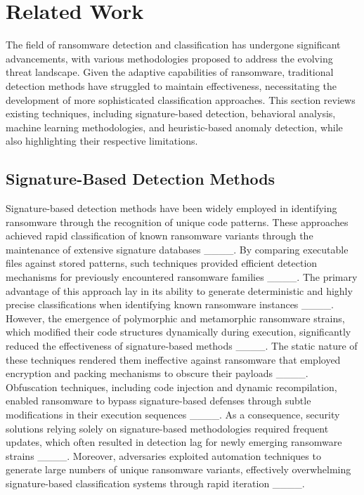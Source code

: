 \section{Related Work}
The field of ransomware detection and classification has undergone significant advancements, with various methodologies proposed to address the evolving threat landscape. Given the adaptive capabilities of ransomware, traditional detection methods have struggled to maintain effectiveness, necessitating the development of more sophisticated classification approaches. This section reviews existing techniques, including signature-based detection, behavioral analysis, machine learning methodologies, and heuristic-based anomaly detection, while also highlighting their respective limitations.

\subsection{Signature-Based Detection Methods}

Signature-based detection methods have been widely employed in identifying ransomware through the recognition of unique code patterns. These approaches achieved rapid classification of known ransomware variants through the maintenance of extensive signature databases ____. By comparing executable files against stored patterns, such techniques provided efficient detection mechanisms for previously encountered ransomware families ____. The primary advantage of this approach lay in its ability to generate deterministic and highly precise classifications when identifying known ransomware instances ____. However, the emergence of polymorphic and metamorphic ransomware strains, which modified their code structures dynamically during execution, significantly reduced the effectiveness of signature-based methods ____. The static nature of these techniques rendered them ineffective against ransomware that employed encryption and packing mechanisms to obscure their payloads ____. Obfuscation techniques, including code injection and dynamic recompilation, enabled ransomware to bypass signature-based defenses through subtle modifications in their execution sequences ____. As a consequence, security solutions relying solely on signature-based methodologies required frequent updates, which often resulted in detection lag for newly emerging ransomware strains ____. Moreover, adversaries exploited automation techniques to generate large numbers of unique ransomware variants, effectively overwhelming signature-based classification systems through rapid iteration ____.

